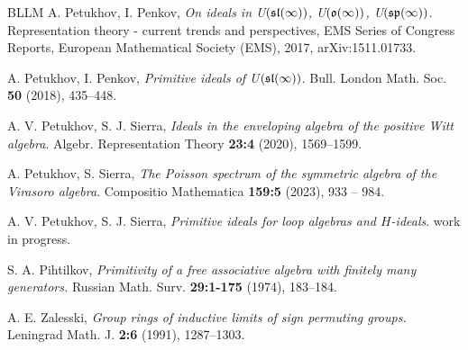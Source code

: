 \documentclass{amsart} \textwidth=18.0cm \oddsidemargin=-1cm \evensidemargin=-1cm \topmargin=-1cm \textheight=23cm
\theoremstyle{definition}
\begin{document}
\begin{thebibliography}{BLLM}
 A. Petukhov, I. Penkov, {\em On ideals in U$(\frak{sl}(\infty))$, U$(\frak o(\infty))$, U$(\frak{sp}(\infty))$}. Representation theory - current trends and perspectives, EMS Series of Congress Reports,  
European Mathematical Society (EMS), 2017, arXiv:1511.01733.

 A. Petukhov, I. Penkov, {\em Primitive ideals of U$(\frak{sl}(\infty))$}. Bull. London Math. Soc. {\bf 50} (2018), 435--448.

 A. V. Petukhov, S. J. Sierra, {\em Ideals in the enveloping algebra of the positive Witt algebra}. Algebr. Representation Theory {\bf 23:4} (2020), 1569--1599. 

 A. Petukhov, S. Sierra, {\em The Poisson spectrum of the symmetric algebra of the Virasoro algebra}. Compositio Mathematica {\bf 159:5} (2023), 933 -- 984.


 A. V. Petukhov, S. J. Sierra, {\em Primitive ideals for loop algebras and $H$-ideals}. work in progress. 

 S. A. Pihtilkov, {\em Primitivity of a free associative algebra with finitely many generators.} Russian Math. Surv. {\bf 29:1-175} (1974), 183--184.

 A. E. Zalesski, {\em Group rings of inductive limits of sign permuting groups.} Leningrad Math. J. {\bf 2:6} (1991), 1287--1303.





\end{thebibliography}
\end{document}

